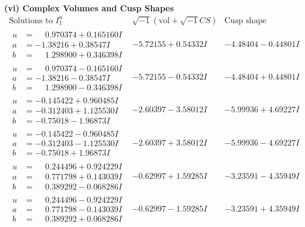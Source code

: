 \documentclass[1p]{elsarticle_modified}
\theoremstyle{definition}
\newcommand{\I}{\sqrt{-1}}
\begin{document}
\newpage\flushleft \textbf{(vi) Complex Volumes and Cusp Shapes}
$$\begin{array}{c|c|c}  
\text{Solutions to }I^u_{1}& \I (\text{vol} + \sqrt{-1}CS) & \text{Cusp shape}\\
 \hline 
\begin{aligned}
u &= \phantom{-}0.970374 + 0.165160 I \\
a &= -1.38216 + 0.38547 I \\
b &= \phantom{-}1.298900 + 0.346398 I\end{aligned}
 & -5.72155 + 0.54332 I & -4.48404 - 0.44801 I \\ \hline\begin{aligned}
u &= \phantom{-}0.970374 - 0.165160 I \\
a &= -1.38216 - 0.38547 I \\
b &= \phantom{-}1.298900 - 0.346398 I\end{aligned}
 & -5.72155 - 0.54332 I & -4.48404 + 0.44801 I \\ \hline\begin{aligned}
u &= -0.145422 + 0.960485 I \\
a &= -0.312403 + 1.125530 I \\
b &= -0.75018 - 1.96873 I\end{aligned}
 & -2.60397 - 3.58012 I & -5.99936 + 4.69227 I \\ \hline\begin{aligned}
u &= -0.145422 - 0.960485 I \\
a &= -0.312403 - 1.125530 I \\
b &= -0.75018 + 1.96873 I\end{aligned}
 & -2.60397 + 3.58012 I & -5.99936 - 4.69227 I \\ \hline\begin{aligned}
u &= \phantom{-}0.244496 + 0.924229 I \\
a &= \phantom{-}0.771798 + 0.143039 I \\
b &= \phantom{-}0.389292 - 0.068286 I\end{aligned}
 & -0.62997 + 1.59285 I & -3.23591 - 4.35949 I \\ \hline\begin{aligned}
u &= \phantom{-}0.244496 - 0.924229 I \\
a &= \phantom{-}0.771798 - 0.143039 I \\
b &= \phantom{-}0.389292 + 0.068286 I\end{aligned}
 & -0.62997 - 1.59285 I & -3.23591 + 4.35949 I \\ \hline\begin{aligned}

\end{aligned}
\end{array}$$
\end{document}
